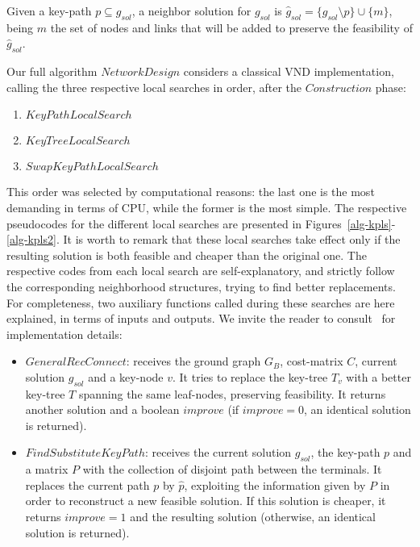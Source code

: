 \documentclass{llncs}
\begin{document}
\begin{definition}
Given a key-path $p \subseteq g_{sol}$, a neighbor solution for $g_{sol}$ is 
$\hat{g}_{sol} = \{ g_{sol}\setminus p \}\cup \{m\}$, 
being $m$ the set of nodes and links that will be added to preserve the feasibility of ${\hat{g}}_{sol}$.  
\end{definition}

Our full algorithm $NetworkDesign$ considers a classical VND implementation, calling the three respective local searches in order, after the $Construction$ phase:
\begin{enumerate}
\item $KeyPathLocalSearch$
\item $KeyTreeLocalSearch$
\item $SwapKeyPathLocalSearch$
\end{enumerate}
This order was selected by computational reasons: the last one is the most demanding in terms of CPU, while the former 
is the most simple. The respective pseudocodes for the different local searches are presented in Figures~\ref{alg-kpls}-\ref{alg-kpls2}. It is worth to remark that these local searches take effect only if the resulting solution is both feasible and cheaper than the original one. The respective codes from each local search are self-explanatory, and strictly follow  the corresponding neighborhood structures, trying to find better replacements. For completeness, two auxiliary functions 
called during these searches are here explained, in terms of inputs and outputs. 
We invite the reader to consult~\cite{117} for implementation details:
\begin{itemize}
\item $GeneralRecConnect$: receives the ground graph $G_B$, cost-matrix $C$, current solution $g_{sol}$ and a 
key-node $v$. It tries to replace the key-tree $T_v$ with a better key-tree $T$ spanning the same leaf-nodes, preserving feasibility. It returns another solution and a boolean $improve$ (if $improve=0$, an identical solution is returned).
\item $FindSubstituteKeyPath$: receives the current solution $g_{sol}$, the key-path $p$ and a matrix $P$ with the 
collection of disjoint path between the terminals. It replaces the current path $p$ by $\hat{p}$, exploiting the information given by $P$ in order to reconstruct a new feasible solution. If this solution is cheaper, it returns $improve=1$ 
and the resulting solution (otherwise, an identical solution is returned). 
\end{itemize}
\end{document}
